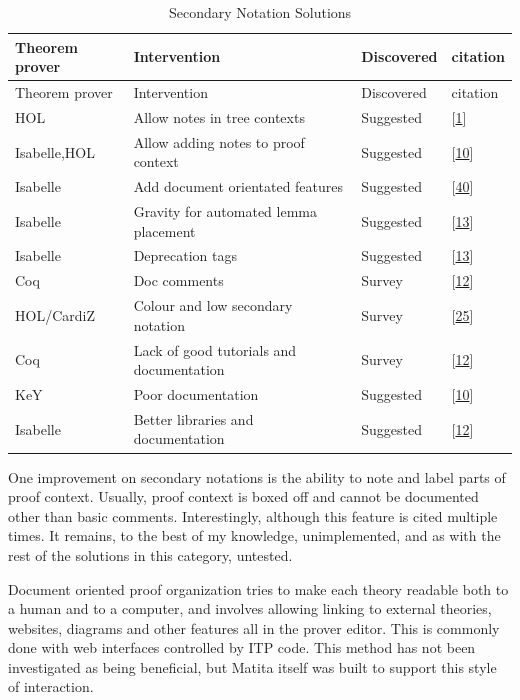 \documentclass[
]{article}
\begin{document}
\hypertarget{tbl:secondary_notation}{}
\begin{longtable}[]{@{}llll@{}}
\caption{\label{tbl:secondary_notation}Secondary Notation
Solutions}\tabularnewline
\toprule
Theorem prover & Intervention & Discovered & citation \\
\midrule
\endfirsthead
\toprule
Theorem prover & Intervention & Discovered & citation \\
\midrule
\endhead
HOL & Allow notes in tree contexts & Suggested &
{[}\protect\hyperlink{ref-aitken_interactive_1998}{1}{]} \\
Isabelle,HOL & Allow adding notes to proof context & Suggested &
{[}\protect\hyperlink{ref-beckert_evaluating_2012}{10}{]} \\
Isabelle & Add document orientated features & Suggested &
{[}\protect\hyperlink{ref-wenzel_isabelle_2011}{40}{]} \\
Isabelle & Gravity for automated lemma placement & Suggested &
{[}\protect\hyperlink{ref-bourke_challenges_2012}{13}{]} \\
Isabelle & Deprecation tags & Suggested &
{[}\protect\hyperlink{ref-bourke_challenges_2012}{13}{]} \\
Coq & Doc comments & Survey &
{[}\protect\hyperlink{ref-berman_development_2014}{12}{]} \\
HOL/CardiZ & Colour and low secondary notation & Survey &
{[}\protect\hyperlink{ref-kadoda_cognitive_2000}{25}{]} \\
Coq & Lack of good tutorials and documentation & Survey &
{[}\protect\hyperlink{ref-berman_development_2014}{12}{]} \\
KeY & Poor documentation & Suggested &
{[}\protect\hyperlink{ref-beckert_evaluating_2012}{10}{]} \\
Isabelle & Better libraries and documentation & Suggested &
{[}\protect\hyperlink{ref-berman_development_2014}{12}{]} \\
\bottomrule
\end{longtable}

One improvement on secondary notations is the ability to note and label
parts of proof context. Usually, proof context is boxed off and cannot
be documented other than basic comments. Interestingly, although this
feature is cited multiple times. It remains, to the best of my
knowledge, unimplemented, and as with the rest of the solutions in this
category, untested.

Document oriented proof organization tries to make each theory readable
both to a human and to a computer, and involves allowing linking to
external theories, websites, diagrams and other features all in the
prover editor. This is commonly done with web interfaces controlled by
ITP code. This method has not been investigated as being beneficial, but
Matita itself was built to support this style of interaction.
\end{document}
